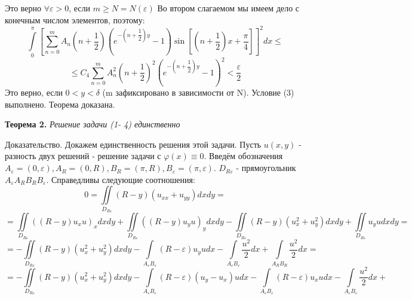 \documentclass[a4paper, 9pt]{article}
\begin{document}
	Это верно $\forall \varepsilon > 0$, если $m \geq N =N(\varepsilon)$\newline
	Во втором слагаемом мы имеем дело с конечным числом элементов, поэтому:
	\begin{equation*}
		\int\limits_0^\pi \left[	\sum\limits_{n=0}^{m} A_n\left(n+\dfrac12\right) \left( e^{-\left(n+\dfrac12\right)y} - 1\right) \sin{\left[\left(n+\dfrac12\right) x  + \dfrac\pi4\right]} \right]^2 dx \leq
	\end{equation*}
	\begin{equation*}
		\leq C_4 \sum\limits_{n=0}^{m} A_n^2 \left(n +\dfrac12\right)^2 \left(e^{-\left(n+\dfrac12\right)y} - 1\right)^2 < \dfrac{\varepsilon}{2}
	\end{equation*}
	Это верно, если $0 < y < \delta$ (m зафиксировано в зависимости от N). Условие (3) выполнено. Теорема доказана.
	\par
		\textbf{Теорема 2.} \textit{Решение задачи (1- 4) единственно}
	\par
		Доказательство. Докажем единственность решения этой задачи. Пусть $u(x,y)$ - разность двух решений - решение задачи с $\varphi(x) \equiv 0$.
		Введём обозначения $A_\varepsilon = (0, \varepsilon), A_R = (0, R), B_R = (\pi, R), B_\varepsilon = (\pi, \varepsilon)$. $D_{R\varepsilon}$ - прямоугольник $A_\varepsilon A_R B_R B_\varepsilon$. Справедливы следующие соотношения:
		\begin{equation*}
			0 = \iint\limits_{D_{R\varepsilon}} (R-y) (u_{xx} + u_{yy}) dx dy = 
		\end{equation*}
		\begin{equation*}
			=	\iint\limits_{D_{R\varepsilon}} \left( \left(R - y\right) u_x u\right)_x dx dy  + \iint\limits_{D_{R\varepsilon}} \left( \left(R - y\right) u_y u\right)_y dx dy  
			- \iint\limits_{D_{R\varepsilon}} \left(R- y\right) \left(u_x^2 + u_y^2\right)dxdy + \iint\limits_{D_{R\varepsilon}} u_y u dx dy = 
		\end{equation*}
		\begin{equation*}
			= - \iint\limits_{D_{R\varepsilon}} \left(R - y\right) \left(u_x^2 + u_y^2\right) dx dy
			- \int\limits_{A_\varepsilon B_\varepsilon} \left(R - \varepsilon\right) u_y u dx 
			-\int\limits_{A_\varepsilon B_\varepsilon} \dfrac{u^2}{2} dx + \int\limits_{A_R B_R} \dfrac{u^2}{2} dx = 
		\end{equation*}
		\begin{equation*}
			= - \iint\limits_{D_{R\varepsilon}} \left(R - y\right) \left(u_x^2 + u_y^2\right) dx dy - 
			\int\limits_{A_\varepsilon B_\varepsilon} \left(R - \varepsilon \right) \left(u_y - u_x\right)u dx - \int\limits_{A_\varepsilon B_\varepsilon} \left(R - \varepsilon\right) u_x u dx - \int\limits_{A_\varepsilon B_\varepsilon}\dfrac{u^2}{2} dx +
		\end{equation*}
\end{document}
